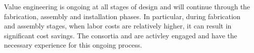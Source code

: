 Value engineering is ongoing at all stages of design and will continue
through the fabrication, assembly and installation phases. In
particular, during fabrication and assembly stages, when labor costs
are relatively higher, it can result in significant cost savings. The
consortia and  are activley engaged and have the necessary
experience for this ongoing process.
